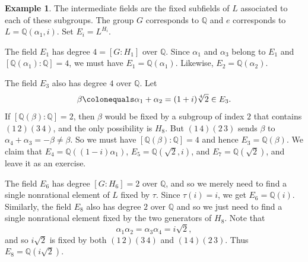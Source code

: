 \documentclass[12pt]{report}
\numberwithin{equation}{section}
\numberwithin{theorem}{chapter}
\theoremstyle{definition}
\newtheorem{example}[theorem]{Example}
\newtheorem*{basic properties}{Basic Properties}
\newtheorem*{Important Remark}{Important Remark}
\newcommand{\Q}{\mathbb{Q}}
\begin{document}
\begin{example}

The intermediate fields are the fixed subfields of $L$ associated to each of these subgroups. The group $G$ corresponds to $\Q$ and $e$ corresponds to $L = \Q(\alpha_1, i)$. Set $E_i = L^{H_i}$.

The field $E_1$ has degree $4 = [G:H_1]$ over $\Q$. Since $\alpha_1$ and $\alpha_3$ belong to $E_1$ and $[\Q(\alpha_1):\Q]=4$, we must have $E_1 = \Q(\alpha_1)$. Likewise, $E_2 = \Q(\alpha_2)$.

The field $E_3$ also has degree $4$ over $\Q$. Let 
$$\beta \colonequals \alpha_1 + \alpha_2 = (1+i)\sqrt[4]{2} \in E_3.$$ 
If $[\Q(\beta):\Q] = 2$, then $\beta$ would be fixed by a subgroup of index $2$ that contains $(1 \, 2)(3 \, 4)$, and the only possibility is $H_8$. But $(1 \, 4)(2 \, 3)$ sends $\beta$ to $\alpha_4 + \alpha_3 = - \beta \neq \beta$. So we must have $[\Q(\beta):\Q] = 4$ and hence $E_3 = \Q(\beta)$.
We claim that $E_4 = \Q((1-i) \alpha_1)$, $E_5 = \Q(\sqrt{2},i)$, and $E_7 = \Q(\sqrt{2})$, and leave it as an exercise.


The field $E_6$ has degree $[G:H_6] = 2$ over $\Q$, and so we merely need to find a single nonrational element of $L$ fixed by $\tau$. Since $\tau(i) = i$, we get $E_6 = \Q(i)$.
Similarly, the field $E_8$ also has degree $2$ over $\Q$ and so we just need to find a single nonrational element fixed by the two generators of $H_8$.
Note that
$$\alpha_1 \alpha_2 = \alpha_3 \alpha_4 = i \sqrt{2},$$ 
and so $i \sqrt{2}$ is fixed by both $(1 \, 2)(3 \, 4)$ and  $(1 \,4)(2 \, 3)$. Thus $E_8 =\Q(i \sqrt{2})$.


\end{example}
\end{document}
